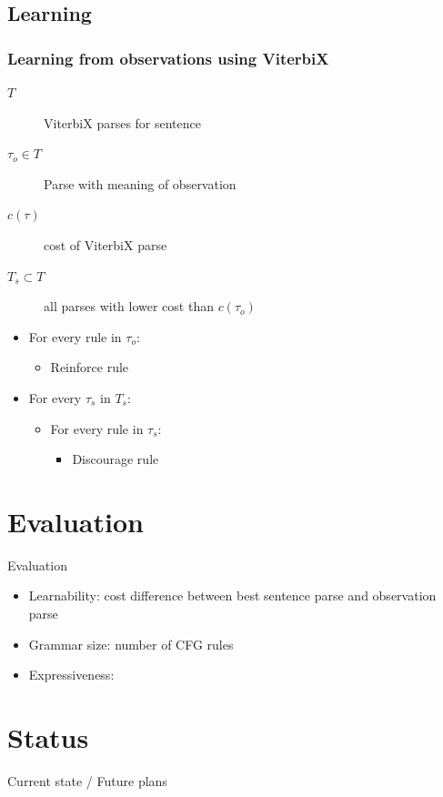 \documentclass[11pt,a4paper,xcolor=dvipsnames]{beamer}
\begin{document}
\subsection{Learning}
\begin{frame} %
\frametitle{Learning from observations using ViterbiX}
\begin{description}
  \item[$T$] ViterbiX parses for sentence
  \item[$\tau_o \in T$] Parse with meaning of observation
  \item[$c(\tau)$] cost of ViterbiX parse
  \item[$T_s \subset T$] all parses with lower cost than $c(\tau_o)$
\end{description}

\begin{itemize}
\item For every rule in $\tau_o$:
    \begin{itemize}
      \item Reinforce rule
    \end{itemize}
  \item For every $\tau_s$ in $T_s$:
    \begin{itemize}
      \item For every rule in $\tau_s$:
        \begin{itemize}
          \item Discourage rule
        \end{itemize}
    \end{itemize}
\end{itemize}
\end{frame}

\section{Evaluation}
\begin{frame}{Evaluation} %
\begin{itemize}
  \item Learnability: cost difference between best sentence parse and observation parse
  \item Grammar size: number of CFG rules
  \item Expressiveness: 
\end{itemize}
\end{frame}

\section{Status} %
\begin{frame}
  Current state / Future plans
\end{frame}
\end{document}
